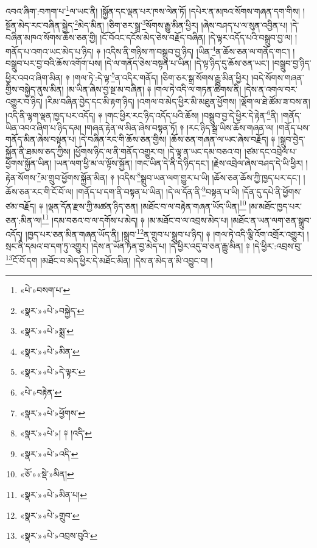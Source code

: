 འབའ་ཞིག་:བཀག་པ་\footnote{«པེ་»བསག་པ་}ལ་ཡང་ནི། །སྐྱོན་དང་ལྡན་པར་ཁས་ལེན་ཏོ། །དཔེར་ན་མཁའ་སོགས་གཞན་དག་གིས། །སྔོན་མེད་རང་བཞིན་སྐྱེད་\footnote{«སྣར་»«པེ་»བསྐྱེད་}མེད་མིན། །ཅིག་ཅར་སྒྲ་\footnote{«སྣར་»«པེ་»སྨྲ་}སོགས་རྒྱུ་མིན་ཕྱིར། །ཞེས་བཤད་པ་ལ་སུན་འབྱིན་པ། །དེ་བཞིན་མཁའ་སོགས་ཆོས་ཅན་གྱི། །ངོ་བོའང་དངོས་མེད་ཅེས་བརྗོད་བཞིན། །དེ་ལྟར་འདོད་པའི་བསྒྲུབ་བྱ་ལ། །གནོད་པ་འགའ་ཡང་མེད་པ་ཉིད། ༈ །འདིས་ནི་གཉིས་ཀ་བསྒྲུབ་བྱ་ཉིད། །ཡིན་\footnote{«སྣར་»«པེ་»མིན་}ན་ཆོས་ཅན་ལ་གནོད་གང་། །བསྒྲུབ་པར་བྱ་བའི་ཆོས་འགོག་པས། །དེ་ལ་གནོད་ཅེས་བསྟན་པ་ཡིན། །དེ་ལྟ་ཉིད་དུ་ཆོས་ཅན་ཡང་། །བསྒྲུབ་བྱ་ཉིད་ཕྱིར་འབའ་ཞིག་མིན། ༈ །གལ་ཏེ་:དེ་ལྟ་\footnote{«སྣར་»«པེ་»དེ་ལྟར་}ན་འདིར་གནོད། །ཅིག་ཅར་སྒྲ་སོགས་རྒྱུ་མིན་ཕྱིར། །བདེ་སོགས་གཞན་གྱིས་བསྐྱེད་ནུས་མིན། །མ་ཡིན་ཞེས་བྱ་སྔ་མ་བཞིན། ༈ །གལ་ཏེ་འདི་ལ་གཏན་ཚིགས་ནི། །དེས་ན་འགལ་བར་འགྱུར་བ་ཉིད། །རིམ་བཞིན་བྱེད་དང་མི་རྟག་ཉིད། །འགལ་བ་མེད་ཕྱིར་མི་མཐུན་ཕྱོགས། །ལྡོག་ལ་ཐེ་ཚོམ་ཟ་བས་ན། །འདི་ནི་ལྷག་ལྡན་ཁྱད་པར་འདོད། ༈ །གང་ཕྱིར་རང་ཉིད་འདོད་པའི་ཆོས། །བསྒྲུབ་བྱ་དེ་ཕྱིར་དེ་རྟེན་\footnote{«པེ་»བརྟེན་}ནི། །གནོད་ཡིན་འབའ་ཞིག་པ་ཉིད་དམ། །གཞན་རྟེན་ལ་མིན་ཞེས་བསྟན་ཏོ། ༈ །རང་ཉིད་སྒྲ་ཡིས་ཆོས་གཞན་ལ། །གནོད་པས་གནོད་མིན་ཞེས་བསྟན་པ། །དེ་བཞིན་རང་གི་ཆོས་ཅན་གྱིས། །ཆོས་ཅན་གཞན་ལ་ཡང་ཞེས་བརྗོད། ༈ །སྒྲུབ་བྱེད་སྐྱོན་ནི་ཐམས་ཅད་ཀྱིས། །ཕྱོགས་ཉིད་ལ་ནི་གནོད་འགྱུར་བ། །དེ་ལྟ་ན་ཡང་དམ་བཅའ་བ། །ཙམ་དང་འབྲེལ་པ་ཕྱོགས་སྐྱོན་ཡིན། །ཡན་ལག་ཕྱི་མ་ལ་ལྟོས་སྐྱོན། །གང་ཡིན་དེ་ནི་དེ་ཉིད་དང་། །རྗེས་འབྲེལ་ཞེས་བཤད་དེ་ཡི་ཕྱིར། །རྟེན་སོགས་\footnote{«སྣར་»«པེ་»ཕྱོགས་}མ་གྲུབ་ཕྱོགས་སྐྱོན་མིན། ༈ །འདིས་\footnote{«སྣར་»«པེ་»། ༈ །འདི་}སྒྲུབ་ཡན་ལག་གྱུར་པ་ཡི། །ཆོས་ཅན་ཆོས་ཀྱི་ཁྱད་པར་དང་། །ཆོས་ཅན་རང་གི་ངོ་བོ་ལ། །གནོད་པ་དག་ནི་བསྟན་པ་ཡིན། །དེ་ལ་དོན་ནི་\footnote{«སྣར་»«པེ་»འདི་}བསྟན་པ་ཡི། །དོན་དུ་དཔེ་ནི་ཕྱོགས་ཙམ་བརྗོད། ༈ །ལྡན་དོན་རྫས་ཀྱི་མཚན་ཉིད་ཅན། །མཐོང་བ་ལ་བརྟེན་གཞན་ཡོད་ཡིན།\footnote{«ཅོ་»«སྡེ་»མིན།} །མ་མཐོང་ཁྱད་པར་ཅན་:མིན་ལ།\footnote{«སྣར་»«པེ་»མིན་པ།} །དམ་བཅའ་བ་ལ་དགོས་པ་མེད། ༈ །མ་མཐོང་བ་ལ་འབྲས་མེད་པ། །མཐོང་ན་ཡན་ལག་ཅན་སྒྲུབ་འདོད། །ཁྱད་པར་ཅན་མིན་གཞན་ཡོད་ནི། །སྒྲུབ་\footnote{«སྣར་»«པེ་»གྲུབ་}ན་གྲུབ་པ་སྒྲུབ་པ་ཉིད། ༈ །གལ་ཏེ་འདི་ལྕི་འོག་འགྲོར་འགྱུར། །སྲང་ནི་དམའ་བ་དག་ཏུ་འགྱུར། །དེས་ན་ཡོན་ཏན་བྱ་མེད་པ། །དེ་ཕྱིར་འདུ་བ་ཅན་རྒྱུ་མིན། ༈ །དེ་ཕྱིར་:འབྲས་བུ་\footnote{«སྣར་»«པེ་»འབྲས་བུའི་}ངོ་བོ་དག །མཐོང་བ་མེད་ཕྱིར་དེ་མཐོང་མིན། །དེས་ན་མེད་ན་མི་འབྱུང་བ། །

